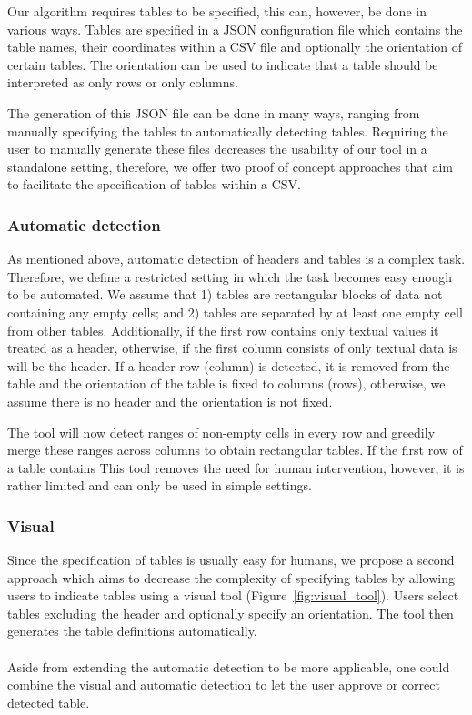 \documentclass{IEEEtran}
\theoremstyle{definition}
\begin{document}
Our algorithm requires tables to be specified, this can, however, be done in various ways.
Tables are specified in a JSON configuration file which contains the table names, their coordinates within a CSV file and optionally the orientation of certain tables.
The orientation can be used to indicate that a table should be interpreted as only rows or only columns.

The generation of this JSON file can be done in many ways, ranging from manually specifying the tables to automatically detecting tables.
Requiring the user to manually generate these files decreases the usability of our tool in a standalone setting, therefore, we offer two proof of concept approaches that aim to facilitate the specification of tables within a CSV.

\subsubsection{Automatic detection}
As mentioned above, automatic detection of headers and tables is a complex task.
Therefore, we define a restricted setting in which the task becomes easy enough to be automated.
We assume that 1) tables are rectangular blocks of data not containing any empty cells; and 2) tables are separated by at least one empty cell from other tables.
Additionally, if the first row contains only textual values it treated as a header, otherwise, if the first column consists of only textual data is will be the header.
If a header row (column) is detected, it is removed from the table and the orientation of the table is fixed to columns (rows), otherwise, we assume there is no header and the orientation is not fixed.

The tool will now detect ranges of non-empty cells in every row and greedily merge these ranges across columns to obtain rectangular tables.
If the first row of a table contains 
This tool removes the need for human intervention, however, it is rather limited and can only be used in simple settings.

\subsubsection{Visual}
Since the specification of tables is usually easy for humans, we propose a second approach which aims to decrease the complexity of specifying tables by allowing users to indicate tables using a visual tool (Figure~\ref{fig:visual_tool}).
Users select tables excluding the header and optionally specify an orientation.
The tool then generates the table definitions automatically.
\\\\
Aside from extending the automatic detection to be more applicable, one could combine the visual and automatic detection to let the user approve or correct detected table.
\end{document}
